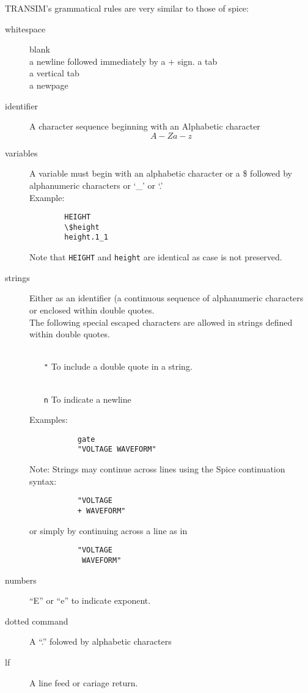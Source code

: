 TRANSIM's grammatical rules are very similar to those of spice:
\begin{description}
\item[whitespace] blank\\
		  a newline followed immediately by a $+$ sign. 
		  a tab\\
		  a vertical tab\\
		  a newpage
\item[identifier] A character sequence beginning with an Alphabetic
               character \[A-Za-z\]
\item[variables] A variable must begin with an alphabetic character or a \$
		followed by alphanumeric characters or `\_' or `.' \\[0.2in]
		Example: \\
		\begin{verbatim}
		HEIGHT
		\$height
		height.1_1
		\end{verbatim}
		Note that {\tt HEIGHT} and {\tt height} are identical as
		case is not preserved.
\item[strings] Either as an identifier (a continuous sequence of
alphanumeric characters or enclosed within double quotes. \\
	       The following special escaped characters are allowed in
	       strings defined within double quotes.
	       \begin{itemize}
	       \item[{\tt \\"}] To include a double quote in a string.
	       \item[{\tt \\n}] To indicate a newline
	       \end{itemize}
	       Examples:
	       \begin{verbatim}
	       gate
	       "VOLTAGE WAVEFORM"
	       \end{verbatim}
	       Note: Strings may continue across lines using the Spice
	       continuation syntax:
	       \begin{verbatim}
	       "VOLTAGE
	       + WAVEFORM"
	       \end{verbatim}
	       or simply by continuing across a line as in
	       \begin{verbatim}
	       "VOLTAGE
	        WAVEFORM"
	       \end{verbatim}

\item[numbers] ``E'' or ``e'' to indicate exponent.
\item[dotted command] A ``.'' folowed by alphabetic characters
\item[lf] A line feed or cariage return.
\end{description}


